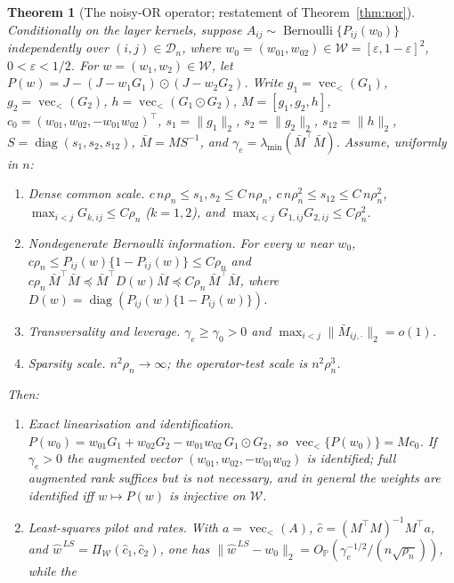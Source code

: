 \documentclass[12pt]{article}
\newtheorem{theorem}{Theorem}
\newcommand{\1}{\mathbf{1}}
\begin{document}
\begin{theorem}[The noisy-OR operator; restatement of Theorem~\ref{thm:nor}]
\label{thm:nor-cor}
Conditionally on the layer kernels, suppose $A_{ij}\sim\operatorname{Bernoulli}\{P_{ij}(w_0)\}$
independently over $(i,j)\in\mathcal D_n$, where $w_0=(w_{01},w_{02})\in\mathcal W=[\varepsilon,
1-\varepsilon]^2$, $0<\varepsilon<1/2$. For $w=(w_1,w_2)\in\mathcal W$, let
$P(w)=J-(J-w_1G_1)\odot(J-w_2G_2)$. Write $g_1=\operatorname{vec}_<(G_1)$,
$g_2=\operatorname{vec}_<(G_2)$, $h=\operatorname{vec}_<(G_1\odot G_2)$, $M=[g_1,g_2,h]$,
$c_0=(w_{01},w_{02},-w_{01}w_{02})^\top$, $s_1=\|g_1\|_2$, $s_2=\|g_2\|_2$, $s_{12}=\|h\|_2$,
$S=\operatorname{diag}(s_1,s_2,s_{12})$, $\bar M=MS^{-1}$, and $\gamma_e=\lambda_{\min}(\bar M^\top\bar
M)$. Assume, uniformly in $n$:
\begin{enumerate}
\item[(A1)] \emph{Dense common scale.} $c\,n\rho_n\le s_1,s_2\le C\,n\rho_n$,
$c\,n\rho_n^2\le s_{12}\le C\,n\rho_n^2$, $\max_{i<j}G_{k,ij}\le C\rho_n$ ($k=1,2$), and
$\max_{i<j}G_{1,ij}G_{2,ij}\le C\rho_n^2$.
\item[(A2)] \emph{Nondegenerate Bernoulli information.} For every $w$ near $w_0$,
$c\rho_n\le P_{ij}(w)\{1-P_{ij}(w)\}\le C\rho_n$ and
$c\rho_n\,\bar M^\top\bar M\preceq\bar M^\top D(w)\bar M\preceq C\rho_n\,\bar M^\top\bar M$, where
$D(w)=\operatorname{diag}(P_{ij}(w)\{1-P_{ij}(w)\})$.
\item[(A3)] \emph{Transversality and leverage.} $\gamma_e\ge\gamma_0>0$ and
$\max_{i<j}\|\bar M_{ij,\cdot}\|_2=o(1)$.
\item[(A4)] \emph{Sparsity scale.} $n^2\rho_n\to\infty$; the operator-test scale is $n^2\rho_n^3$.
\end{enumerate}
Then:
\begin{enumerate}
\item[(a)] \emph{Exact linearisation and identification.}
$P(w_0)=w_{01}G_1+w_{02}G_2-w_{01}w_{02}\,G_1\odot G_2$, so
$\operatorname{vec}_<\{P(w_0)\}=Mc_0$. If $\gamma_e>0$ the augmented vector
$(w_{01},w_{02},-w_{01}w_{02})$ is identified; full augmented rank suffices but is not necessary, and
in general the weights are identified iff $w\mapsto P(w)$ is injective on $\mathcal W$.
\item[(b)] \emph{Least-squares pilot and rates.} With $a=\operatorname{vec}_<(A)$,
$\widehat c=(M^\top M)^{-1}M^\top a$, and $\widehat w^{\,LS}=\Pi_{\mathcal W}(\widehat c_1,\widehat
c_2)$, one has $\|\widehat w^{\,LS}-w_0\|_2=O_{\mathbb P}(\gamma_e^{-1/2}/(n\sqrt{\rho_n}))$, while the

\end{enumerate}
\end{theorem}
\end{document}
